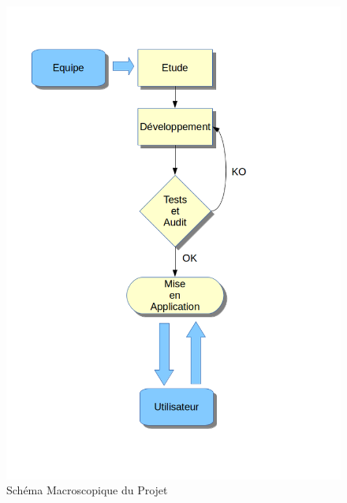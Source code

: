 \documentclass{"../../res/univ-projet"}
\begin{document}
\begin{figure}[h!]
  \centering
  \includegraphics[scale=0.5]{../graphics/diagramme1.png}
  \caption{Schéma Macroscopique du Projet}
  \setlength{\parindent}{1cm}
\end{figure}
\end{document}
